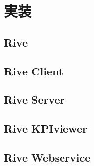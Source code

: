 \chapter{実装}
\label{implementation}

\section{Rive}

\section{Rive Client}

\section{Rive Server}

\section{Rive KPIviewer}

\section{Rive Webservice}

